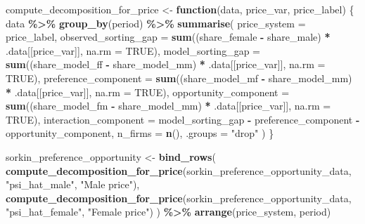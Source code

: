 \documentclass[
]{article}
\newenvironment{Shaded}{\begin{snugshade}}{\end{snugshade}}
\newcommand{\AttributeTok}[1]{\textcolor[rgb]{0.13,0.29,0.53}{#1}}
\newcommand{\ConstantTok}[1]{\textcolor[rgb]{0.56,0.35,0.01}{#1}}
\newcommand{\ControlFlowTok}[1]{\textcolor[rgb]{0.13,0.29,0.53}{\textbf{#1}}}
\newcommand{\FunctionTok}[1]{\textcolor[rgb]{0.13,0.29,0.53}{\textbf{#1}}}
\newcommand{\NormalTok}[1]{#1}
\newcommand{\OtherTok}[1]{\textcolor[rgb]{0.56,0.35,0.01}{#1}}
\newcommand{\SpecialCharTok}[1]{\textcolor[rgb]{0.81,0.36,0.00}{\textbf{#1}}}
\newcommand{\StringTok}[1]{\textcolor[rgb]{0.31,0.60,0.02}{#1}}
\begin{document}
\begin{Shaded}
\begin{Highlighting}[]
\NormalTok{compute\_decomposition\_for\_price }\OtherTok{\textless{}{-}} \ControlFlowTok{function}\NormalTok{(data, price\_var, price\_label) \{}
\NormalTok{    data }\SpecialCharTok{\%\textgreater{}\%}
        \FunctionTok{group\_by}\NormalTok{(period) }\SpecialCharTok{\%\textgreater{}\%}
        \FunctionTok{summarise}\NormalTok{(}
            \AttributeTok{price\_system =}\NormalTok{ price\_label,}
            \AttributeTok{observed\_sorting\_gap =} \FunctionTok{sum}\NormalTok{((share\_female }\SpecialCharTok{{-}}\NormalTok{ share\_male) }\SpecialCharTok{*}\NormalTok{ .data[[price\_var]], }\AttributeTok{na.rm =} \ConstantTok{TRUE}\NormalTok{),}
            \AttributeTok{model\_sorting\_gap =} \FunctionTok{sum}\NormalTok{((share\_model\_ff }\SpecialCharTok{{-}}\NormalTok{ share\_model\_mm) }\SpecialCharTok{*}\NormalTok{ .data[[price\_var]], }\AttributeTok{na.rm =} \ConstantTok{TRUE}\NormalTok{),}
            \AttributeTok{preference\_component =} \FunctionTok{sum}\NormalTok{((share\_model\_mf }\SpecialCharTok{{-}}\NormalTok{ share\_model\_mm) }\SpecialCharTok{*}\NormalTok{ .data[[price\_var]], }\AttributeTok{na.rm =} \ConstantTok{TRUE}\NormalTok{),}
            \AttributeTok{opportunity\_component =} \FunctionTok{sum}\NormalTok{((share\_model\_fm }\SpecialCharTok{{-}}\NormalTok{ share\_model\_mm) }\SpecialCharTok{*}\NormalTok{ .data[[price\_var]], }\AttributeTok{na.rm =} \ConstantTok{TRUE}\NormalTok{),}
            \AttributeTok{interaction\_component =}\NormalTok{ model\_sorting\_gap }\SpecialCharTok{{-}}\NormalTok{ preference\_component }\SpecialCharTok{{-}}\NormalTok{ opportunity\_component,}
            \AttributeTok{n\_firms =} \FunctionTok{n}\NormalTok{(),}
            \AttributeTok{.groups =} \StringTok{"drop"}
\NormalTok{        )}
\NormalTok{\}}

\NormalTok{sorkin\_preference\_opportunity }\OtherTok{\textless{}{-}} \FunctionTok{bind\_rows}\NormalTok{(}
    \FunctionTok{compute\_decomposition\_for\_price}\NormalTok{(sorkin\_preference\_opportunity\_data, }\StringTok{"psi\_hat\_male"}\NormalTok{, }\StringTok{"Male price"}\NormalTok{),}
    \FunctionTok{compute\_decomposition\_for\_price}\NormalTok{(sorkin\_preference\_opportunity\_data, }\StringTok{"psi\_hat\_female"}\NormalTok{, }\StringTok{"Female price"}\NormalTok{)}
\NormalTok{) }\SpecialCharTok{\%\textgreater{}\%}
    \FunctionTok{arrange}\NormalTok{(price\_system, period)}


\end{Highlighting}
\end{Shaded}
\end{document}
